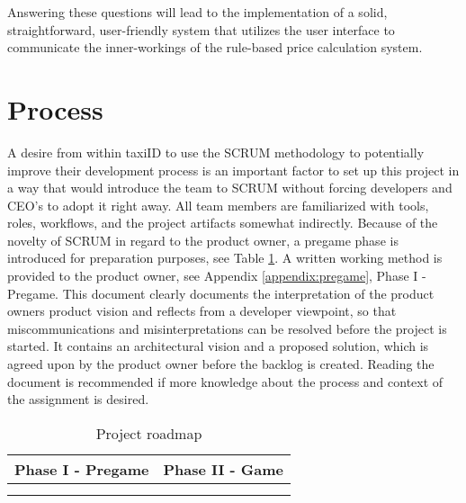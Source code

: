 Answering these questions will lead to the implementation of a solid, straightforward, user-friendly system that utilizes the user interface to communicate the inner-workings of the rule-based price calculation system.

%
\section{Process}
A desire from within taxiID to use the SCRUM methodology to potentially improve their development process is an important factor to set up this project in a way that would introduce the team to SCRUM without forcing developers and CEO's to adopt it right away. All team members are familiarized with tools, roles, workflows, and the project artifacts somewhat indirectly. Because of the novelty of SCRUM in regard to the product owner, a pregame phase is introduced for preparation purposes, see Table \ref{tab:planning}. A written working method is provided to the product owner, see Appendix \ref{appendix:pregame}, Phase I - Pregame. This document clearly documents the interpretation of the product owners product vision and reflects from a developer viewpoint, so that miscommunications and misinterpretations can be resolved before the project is started. It contains an architectural vision and a proposed solution, which is agreed upon by the product owner before the backlog is created. Reading the document is recommended if more knowledge about the process and context of the assignment is desired.

\begin{table}[htbp!]
	\centering
	\begin{tabular}{ccc|c|c|c|c|c|c|c|c}
		\toprule
		\multicolumn{3}{c}{Phase I - Pregame}   &
		\multicolumn{8}{c}{Phase II - Game}  		\\
		\midrule
		\rotate{week 1}                         &
		\rotate{week 2}                         &
		\rotate{week 3}                         &
		\rotate{week 4}                         &
		\rotate{week 5}                         &
		\rotate{week 6}                         &
		\rotate{week 7}                         &
		\rotate{week 8}                         &
		\rotate{week 9}                         &
		\rotate{week 10}                        &
		\rotate{week 11}                        \\
		\midrule
		\rotate{product definition}     				&
		\rotate{architectural vision} 					&
		\rotate{proposed solution}							&
		\rotate{sprint 1}                       &
		\rotate{sprint 2}                       &
		\rotate{sprint 3}                       &
		\rotate{sprint 4}                       &
		\rotate{sprint 5}                       &
		\rotate{sprint 6}                       &
		\rotate{sprint 7}                       &
		\rotate{sprint 8}                       \\
		\bottomrule
	\end{tabular}
	\caption[Planning]{Project roadmap}
	\label{tab:planning}
\end{table}
